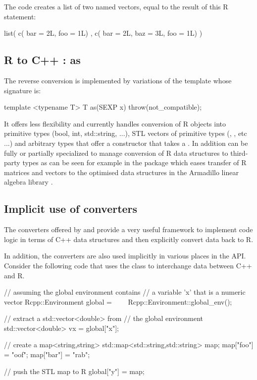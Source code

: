 The code creates a list of two named vectors, equal to the 
result of this R statement:

\begin{example}
list( c( bar = 2L, foo = 1L) , 
      c( bar = 2L, baz = 3L, foo = 1L) )
\end{example}

\subsection{R to C++ : as}

The reverse conversion is implemented by variations of the 
 template whose signature is:
\begin{example}
template <typename T> 
T as(SEXP x) throw(not_compatible);
\end{example}

It offers less flexibility and currently
handles conversion of R objects into primitive types (bool, int, std::string, ...), 
STL vectors of primitive types  (, 
, etc ...) and arbitrary types that offer 
a constructor that takes a . In addition  can 
be fully or partially specialized to manage conversion of R data 
structures to third-party types as can be seen for example in the
 package which eases transfer of R matrices and vectors to
the optimised data structures in the Armadillo linear algebra library \citep{Armadillo}.


\subsection{Implicit use of converters}

The converters offered by  and  provide a very 
useful framework to implement code logic in terms of C++ 
data structures and then explicitly convert data back to R. 

In addition, the converters are also used implicitly
in various places in the  API. 
Consider the following code that uses the  class to 
interchange data between C++ and R.

\begin{example}
// assuming the global environment contains 
// a variable 'x' that is a numeric vector
Rcpp::Environment global = 
\ \ \ \ Rcpp::Environment::global_env();

// extract a std::vector<double> from 
// the global environment
std::vector<double> vx = global["x"];

// create a map<string,string>
std::map<std::string,std::string> map;
map["foo"] = "oof";
map["bar"] = "rab";

// push the STL map to R
global["y"] = map;
\end{example}

